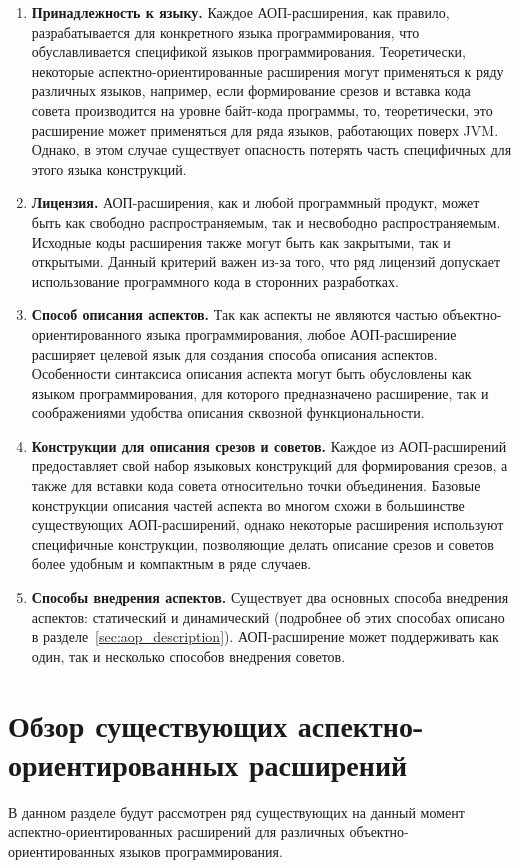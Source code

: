 \begin{enumerate}
\item \textbf{Принадлежность к языку.}
  Каждое АОП-расширения, как правило, разрабатывается для конкретного языка
  программирования, что обуславливается спецификой языков программирования.
  Теоретически, некоторые аспектно-ориентированные расширения могут применяться
  к ряду различных языков, например, если формирование срезов и вставка кода
  совета производится на уровне байт-кода программы, то, теоретически, это
  расширение может применяться для ряда языков, работающих поверх JVM.
  Однако, в этом случае существует опасность потерять часть специфичных для
  этого языка конструкций.
\item \textbf{Лицензия.}
  АОП-расширения, как и любой программный продукт, может быть как свободно
  распространяемым, так и несвободно распространяемым.
  Исходные коды расширения также могут быть как закрытыми, так и открытыми.
  Данный критерий важен из-за того, что ряд лицензий допускает использование
  программного кода в сторонних разработках.
\item \textbf{Способ описания аспектов.}
  Так как аспекты не являются частью объектно-ориентированного языка
  программирования, любое АОП-расширение расширяет целевой язык для создания
  способа описания аспектов.
  Особенности синтаксиса описания аспекта могут быть обусловлены как языком
  программирования, для которого предназначено расширение, так и соображениями
  удобства описания сквозной функциональности.
\item \textbf{Конструкции для описания срезов и советов.}
  Каждое из АОП-расширений предоставляет свой набор языковых конструкций для
  формирования срезов, а также для вставки кода совета относительно точки
  объединения.
  Базовые конструкции описания частей аспекта во многом схожи в большинстве
  существующих АОП-расширений, однако некоторые расширения используют
  специфичные конструкции, позволяющие делать описание срезов и советов более
  удобным и компактным в ряде случаев.
\item \textbf{Способы внедрения аспектов.}
  Существует два основных способа внедрения аспектов: статический и динамический
  (подробнее об этих способах описано в разделе~\ref{sec:aop_description}).
  АОП-расширение может поддерживать как один, так и несколько способов внедрения
  советов.
\end{enumerate}
\section{Обзор существующих аспектно-ориентированных расширений}
В данном разделе будут рассмотрен ряд существующих на данный момент
аспектно-ориентированных расширений для различных объектно-ориентированных
языков программирования.
